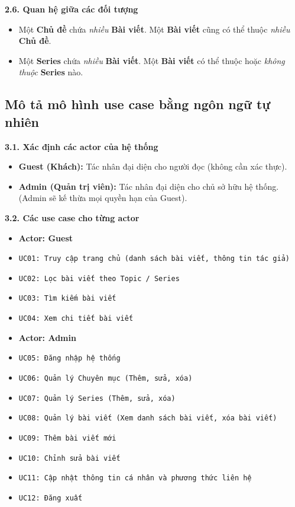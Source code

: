 \documentclass[a4paper,12pt]{article}
\begin{document}
\textbf{2.6. Quan hệ giữa các đối tượng}
\begin{itemize}
    \item Một \textbf{Chủ đề} chứa \textit{nhiều} \textbf{Bài viết}. Một \textbf{Bài viết} cũng có thể thuộc \textit{nhiều} \textbf{Chủ đề}.
    \item Một \textbf{Series} chứa \textit{nhiều} \textbf{Bài viết}. Một \textbf{Bài viết} có thể thuộc hoặc \textit{không thuộc} \textbf{Series} nào.
\end{itemize}

\subsection{Mô tả mô hình use case bằng ngôn ngữ tự nhiên}

\textbf{3.1. Xác định các actor của hệ thống}
\begin{itemize}
    \item \textbf{Guest (Khách):} Tác nhân đại diện cho người đọc (không cần xác thực).
    \item \textbf{Admin (Quản trị viên):} Tác nhân đại diện cho chủ sở hữu hệ thống. (Admin sẽ kế thừa mọi quyền hạn của Guest).
\end{itemize}

\textbf{3.2. Các use case cho từng actor}
\begin{itemize}
    \item \textbf{Actor: Guest}
    \item \texttt{UC01: Truy cập trang chủ (danh sách bài viết, thông tin tác giả)}
    \item \texttt{UC02: Lọc bài viết theo Topic / Series}
    \item \texttt{UC03: Tìm kiếm bài viết}
    \item \texttt{UC04: Xem chi tiết bài viết}
\end{itemize}

\begin{itemize}
    \item \textbf{Actor: Admin}
    \item \texttt{UC05: Đăng nhập hệ thống}
    \item \texttt{UC06: Quản lý Chuyên mục (Thêm, sửa, xóa)}
    \item \texttt{UC07: Quản lý Series (Thêm, sửa, xóa)}
    \item \texttt{UC08: Quản lý bài viết (Xem danh sách bài viết, xóa bài viết)}
    \item \texttt{UC09: Thêm bài viết mới}
    \item \texttt{UC10: Chỉnh sửa bài viết}
    \item \texttt{UC11: Cập nhật thông tin cá nhân và phương thức liên hệ}
    \item \texttt{UC12: Đăng xuất}
\end{itemize}
\newpage
\end{document}
